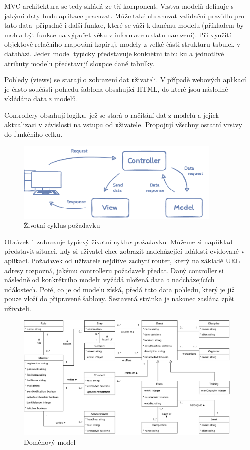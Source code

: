 MVC architektura se tedy skládá ze tří komponent. Vrstva modelů definuje s jakými daty bude aplikace pracovat. Může také obsahovat validační pravidla pro tato data, případně i další funkce, které se váží k danému modelu (příkladem by mohla být funkce na výpočet věku z informace o datu narození). Při využití objektově relačního mapování kopírují modely z velké části strukturu tabulek v databázi. Jeden model typicky představuje konkrétní tabulku a jednotlivé atributy modelu představují sloupce dané tabulky.

Pohledy (views) se starají o zobrazení dat uživateli. V případě webových aplikací je často součástí pohledu šablona obsahující HTML, do které jsou následně vkládána data z modelů.

Controllery obsahují logiku, jež se stará o načítání dat z modelů a jejich aktualizaci v závislosti na vstupu od uživatele. Propojují všechny ostatní vrstvy do funkčního celku.

\begin{figure}[h]
	\caption{Životní cyklus požadavku}
	\label{figure:mvc}
	\centering
	\includegraphics[width=0.9\textwidth]{images/mvc.pdf}
\end{figure}

Obrázek \ref{figure:mvc} zobrazuje typický životní cyklus požadavku. Můžeme si například představit situaci, kdy si uživatel chce zobrazit nadcházející události evidované v aplikaci. Požadavek od uživatele nejdříve zachytí router, který na základě URL adresy rozpozná, jakému controlleru požadavek předat. Daný controller si následně od konkrétního modelu vyžádá uložená data o nadcházejících událostech. Poté, co je od modelu získá, předá tato data pohledu, který je již pouze vloží do připravené šablony. Sestavená stránka je nakonec zaslána zpět uživateli.

\begin{landscape}
	\begin{figure}[h]
		\caption{Doménový model}
		\label{figure:domain-model}
		\centering
		\includegraphics[width=0.9\linewidth]{images/domain-model.pdf}
	\end{figure}
\end{landscape}
